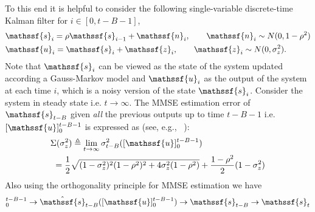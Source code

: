 \documentclass[journal, twocolumn, 10pt]{IEEEtran}
\newcommand{\rvn}{{\mathssf{n}}}    %
\newcommand{\rvs}{{\mathssf{s}}}    %
\newcommand{\rvu}{{\mathssf{u}}}    %
\newcommand{\rvz}{{\mathssf{z}}}    %
\begin{document}
{%
To this end it is helpful to consider the following single-variable discrete-time Kalman filter for $i \in[0, t-B-1]$,
\begin{align}
&\rvs_i=\rho \rvs_{i-1}+ \rvn_{i}, \qquad \rvn_{i} \sim N(0,1-\rho^2) \label{eq:Kalman1}\\
&\rvu_i= \rvs_{i}+ \rvz_{i},\qquad \rvz_{i} \sim N(0,\sigma^{2}_z) \label{eq:Kalman2}.
\end{align} 
Note that $\rvs_{i}$  can be viewed as the state of the system updated according a Gauss-Markov model and $\rvu_{i}$ as the output of the system at each time $i$, which is a noisy version of the state $\rvs_{i}$. Consider the system in steady state i.e. $t\to \infty$. The MMSE estimation error of $\rvs_{t-B}$ given {\em all} the previous outputs up to time $t-B-1$ i.e. $[\rvu]_{0}^{t-B-1}$ is expressed as (see, e.g., ~\cite[Example V.B.2]{poor94}):
\begin{align}
&\Sigma(\sigma^{2}_{z}) \triangleq \lim_{t\to \infty}\sigma^2_{t-B}([\rvu]_{0}^{t-B-1})\\
&~=\frac{1}{2}\sqrt{(1-\sigma^2_{z})^2(1-\rho^2)^2+4\sigma^2_{z}(1-\rho^2) } + \frac{1-\rho^2}{2}(1-\sigma^2_{z}) \label{eq:Sigma}
\end{align} Also using the orthogonality principle for MMSE estimation we have
\begin{align}
[\rvu]_{0}^{t-B-1} \rightarrow \hat{\rvs}_{t-B}([\rvu]_{0}^{t-B-1}) \rightarrow \rvs_{t-B}  \rightarrow \rvs_{t} \label{h4}
\end{align}  


}
\end{document}
